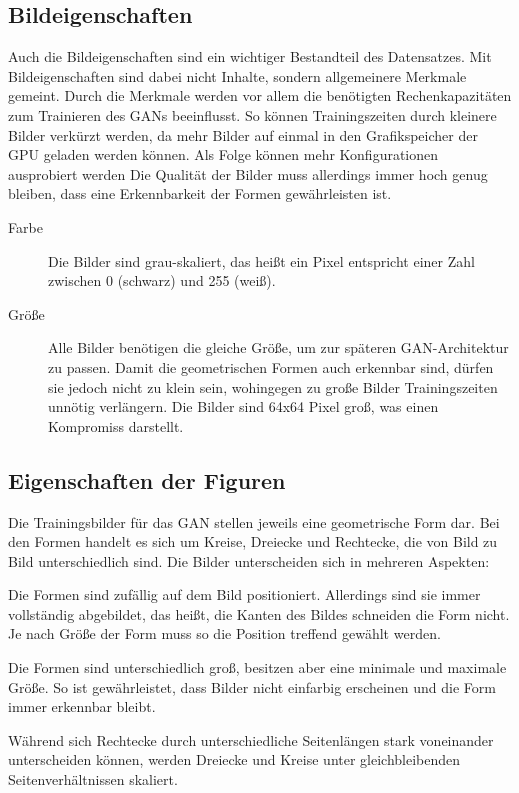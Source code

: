 \subsection{Bildeigenschaften}
Auch die Bildeigenschaften sind ein wichtiger Bestandteil des Datensatzes.
Mit Bildeigenschaften sind dabei nicht Inhalte, sondern allgemeinere Merkmale gemeint.
Durch die Merkmale werden vor allem die benötigten Rechenkapazitäten zum Trainieren des GANs beeinflusst.
So können Trainingszeiten durch kleinere Bilder verkürzt werden, da mehr Bilder auf einmal in den Grafikspeicher der GPU geladen werden können.
Als Folge können mehr Konfigurationen ausprobiert werden
Die Qualität der Bilder muss allerdings immer hoch genug bleiben, dass eine Erkennbarkeit der Formen gewährleisten ist.

\begin{description}
	\item[Farbe]
	Die Bilder sind grau-skaliert, das heißt ein Pixel entspricht einer Zahl zwischen 0 (schwarz) und 255 (weiß).
	
	\item[Größe]
	Alle Bilder benötigen die gleiche Größe, um zur späteren GAN-Architektur zu passen.
	Damit die geometrischen Formen auch erkennbar sind, dürfen sie jedoch nicht zu klein sein, wohingegen zu große Bilder Trainingszeiten unnötig verlängern.
	Die Bilder sind 64x64 Pixel groß, was einen Kompromiss darstellt.
\end{description}

\subsection{Eigenschaften der Figuren}
Die Trainingsbilder für das GAN stellen jeweils eine geometrische Form dar.
Bei den Formen handelt es sich um Kreise, Dreiecke und Rechtecke, die von Bild zu Bild unterschiedlich sind.
Die Bilder unterscheiden sich in mehreren Aspekten:
\begin{description}[style=nextline]
	\item[Position]
	Die Formen sind zufällig auf dem Bild positioniert.
	Allerdings sind sie immer vollständig abgebildet, das heißt, die Kanten des Bildes schneiden die Form nicht.
	Je nach Größe der Form muss so die Position treffend gewählt werden.
	
	\item[Größe und Form]
	Die Formen sind unterschiedlich groß, besitzen aber eine minimale und maximale Größe.
	So ist gewährleistet, dass Bilder nicht einfarbig erscheinen und die Form immer erkennbar bleibt.
	
	Während sich Rechtecke durch unterschiedliche Seitenlängen stark voneinander unterscheiden können, werden Dreiecke und Kreise unter gleichbleibenden Seitenverhältnissen skaliert.
\end{description}


